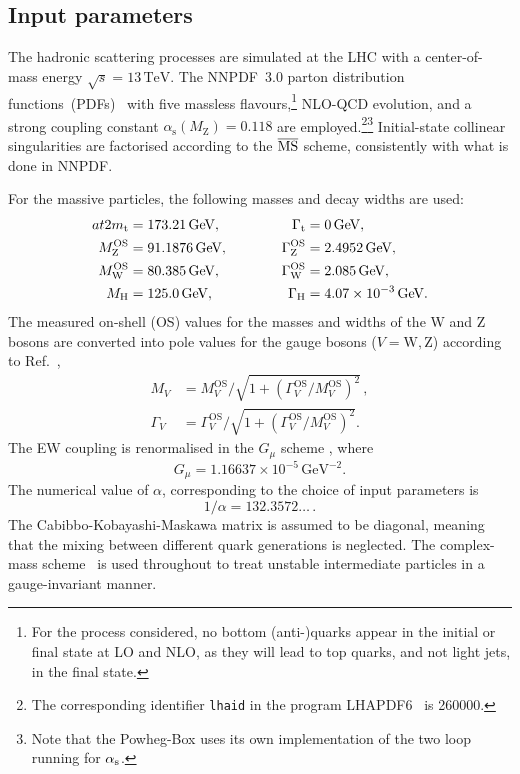 \documentclass[twocolumn,epjc3]{svjour3} %
\newcommand{\PH}{\ensuremath{\text{H}}\xspace}
\newcommand{\Pt}{\ensuremath{\text{t}}\xspace}
\newcommand{\PW}{\ensuremath{\text{W}}\xspace}
\newcommand{\PZ}{\ensuremath{\text{Z}}\xspace}
\newcommand{\Mt}{\ensuremath{m_\Pt}\xspace}
\newcommand{\MWOS}{\ensuremath{M_\PW^\text{OS}}\xspace}
\newcommand{\MZOS}{\ensuremath{M_\PZ^\text{OS}}\xspace}
\newcommand{\MZ}{\ensuremath{M_\PZ}\xspace}
\newcommand{\Gt}{\ensuremath{\Gamma_\Pt}\xspace}
\newcommand{\GH}{\ensuremath{\Gamma_\PH}\xspace}
\newcommand{\GZOS}{\ensuremath{\Gamma_\PZ^\text{OS}}\xspace}
\newcommand{\GWOS}{\ensuremath{\Gamma_\PW^\text{OS}}\xspace}
\newcommand{\GeV}{\ensuremath{\,\text{GeV}}\xspace}
\newcommand{\TeV}{\ensuremath{\,\text{TeV}}\xspace}
\newcommand{\alphas}{\ensuremath{\alpha_\text{s}}\xspace}
\newcommand{\MVOS}{\ensuremath{M_{V}^\text{OS}}\xspace}%
\newcommand{\GVOS}{\ensuremath{\Gamma_{V}^\text{OS}}\xspace}%
\newlength{\width}
\begin{document}
    \subsection{Input parameters}
        \label{subsec:inputpar}
    The hadronic scattering processes are simulated at the LHC with a center-of-mass energy $\sqrt s = 13 \TeV$.
    The NNPDF~3.0 parton distribution functions~(PDFs)~\cite{Ball:2014uwa} with five massless flavours,\footnote{For the process considered, no bottom (anti-)quarks appear in the initial or final state at LO and NLO, as they will lead to top quarks, and not light jets, in the final state.} 
    NLO-QCD evolution, and a strong coupling constant $\alphas\left( \MZ \right) = 0.118$ are employed.\footnote{The corresponding identifier {\tt lhaid} in the program LHAPDF6~\cite{Buckley:2014ana} is 260000.}\footnote{Note that the {\sc Powheg-Box} uses its own implementation of the two loop running for $\alpha_{\rm s}$.}
    Initial-state collinear singularities are factorised according to the ${\overline{\rm MS}}$ scheme, consistently with what is done in NNPDF.

    For the massive particles, the following masses and decay widths are used:
    \begin{align}at{2}
                      \Mt   &=  173.21\GeV,       & \quad \quad \quad \Gt &= 0 \GeV,  \nonumber \\
                    \MZOS &=  91.1876\GeV,      & \quad \quad \quad \GZOS &= 2.4952\GeV,  \nonumber \\
                    \MWOS &=  80.385\GeV,       & \GWOS &= 2.085\GeV,  \nonumber \\
                    M_{\rm H} &=  125.0\GeV,       &  \GH   &=  4.07 \times 10^{-3}\GeV.
    \end{align}
    The measured on-shell (OS) values for the masses and widths of the W and Z bosons are converted into pole values for the gauge bosons ($V=\PW,\PZ$) according to Ref.~\cite{Bardin:1988xt},
    \begin{equation}
    \begin{split}
            M_V &= \MVOS/\sqrt{1+(\GVOS/\MVOS)^2}\,, \\
       \Gamma_V &= \GVOS/\sqrt{1+(\GVOS/\MVOS)^2}.
    \end{split}
    \end{equation}
    The EW coupling is renormalised in the $G_\mu$ scheme \cite{Denner:2000bj}, where
    \begin{equation}
        G_{\mu}    = 1.16637\times 10^{-5}\GeV^{-2}.
    \end{equation}
    The numerical value of $\alpha$, corresponding to the choice of input parameters is
    \begin{equation}
     1/\alpha = 132.3572\ldots\,.
    \end{equation}
    The Cabibbo-Kobayashi-Maskawa matrix is assumed to be diagonal, meaning that the mixing between different quark generations is neglected.
    The complex-mass scheme~\cite{Denner:1999gp,Denner:2005fg,Denner:2006ic} is used throughout to treat unstable intermediate particles in a gauge-invariant manner.
\end{document}
